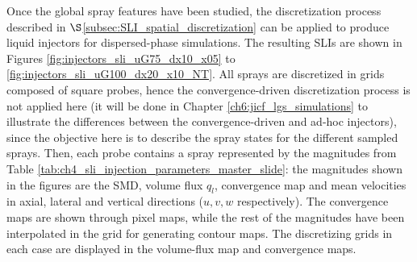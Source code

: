 


\newcommand\scaleSLIJICF{0.15}


Once the global spray features have been studied, the discretization process described in $\S$\ref{subsec:SLI_spatial_discretization} can be applied to produce liquid injectors for dispersed-phase simulations. The resulting SLIs are shown in Figures \ref{fig:injectors_sli_uG75_dx10_x05} to \ref{fig:injectors_sli_uG100_dx20_x10_NT}. All sprays are discretized in grids composed of square probes, hence the convergence-driven discretization process is not applied here (it will be done in Chapter \ref{ch6:jicf_lgs_simulations} to illustrate the differences between the convergence-driven and ad-hoc injectors), since the objective here is to describe the spray states for the different sampled sprays. Then, each probe contains a spray represented by the magnitudes from Table \ref{tab:ch4_sli_injection_parameters_master_slide}: the magnitudes shown in the figures are the SMD, volume flux $q_l$, convergence map and mean velocities in axial, lateral and vertical directions ($u, v, w$ respectively). The convergence maps are shown through pixel maps, while the rest of the magnitudes have been interpolated in the grid for generating contour maps. The discretizing grids in each case are displayed in the volume-flux map and convergence maps.

